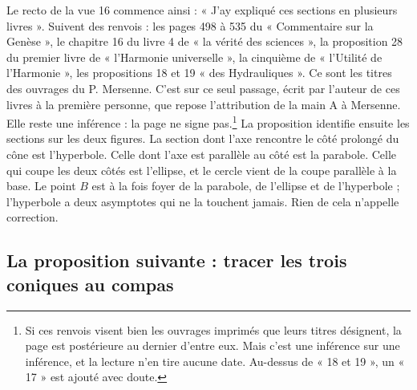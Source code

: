 \documentclass[11pt,a4paper]{article}
\begin{document}
Le recto de la vue 16 commence ainsi : « J'ay expliqué ces sections en plusieurs
livres ». Suivent des renvois : les pages 498 à 535 du « Commentaire sur la
Genèse », le chapitre 16 du livre 4 de « la vérité des sciences », la
proposition 28 du premier livre de « l'Harmonie universelle », la cinquième de
« l'Utilité de l'Harmonie », les propositions 18 et 19 « des Hydrauliques ». Ce
sont les titres des ouvrages du P. Mersenne. C'est sur ce seul passage, écrit
par l'auteur de ces livres à la première personne, que repose l'attribution de
la main A à Mersenne. Elle reste une inférence : la page ne signe
pas.\footnote{Si ces renvois visent bien les ouvrages imprimés que leurs titres
désignent, la page est postérieure au dernier d'entre eux. Mais c'est une
inférence sur une inférence, et la lecture n'en tire aucune date. Au-dessus de
« 18 et 19 », un « 17 » est ajouté avec doute.} La proposition identifie
ensuite les sections sur les deux figures. La section dont l'axe rencontre le
côté prolongé du cône est l'hyperbole. Celle dont l'axe est parallèle au côté
est la parabole. Celle qui coupe les deux côtés est l'ellipse, et le cercle
vient de la coupe parallèle à la base. Le point \(B\) est à la fois foyer de la
parabole, de l'ellipse et de l'hyperbole ; l'hyperbole a deux asymptotes qui ne
la touchent jamais. Rien de cela n'appelle correction.

\subsection*{La proposition suivante : tracer les trois coniques au compas}
\end{document}
